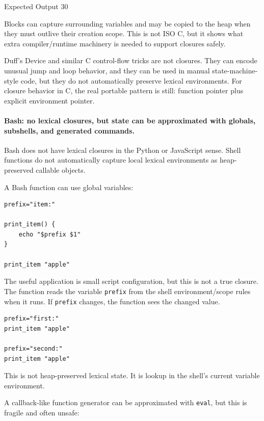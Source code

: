 \begin{iobox}{Expected Output}
30 \\
\end{iobox}



Blocks can capture surrounding variables and may be copied to the heap when they must outlive their creation scope. This is not ISO C, but it shows what extra compiler/runtime machinery is needed to support closures safely.

Duff's Device and similar C control-flow tricks are not closures. They can encode unusual jump and loop behavior, and they can be used in manual state-machine-style code, but they do not automatically preserve lexical environments. For closure behavior in C, the real portable pattern is still: function pointer plus explicit environment pointer.

\paragraph{Bash: no lexical closures, but state can be approximated with globals, subshells, and generated commands.}

Bash does not have lexical closures in the Python or JavaScript sense. Shell functions do not automatically capture local lexical environments as heap-preserved callable objects.

A Bash function can use global variables:

\begin{verbatim}
prefix="item:"

print_item() {
    echo "$prefix $1"
}

print_item "apple"
\end{verbatim}

The useful application is small script configuration, but this is not a true closure. The function reads the variable \texttt{prefix} from the shell environment/scope rules when it runs. If \texttt{prefix} changes, the function sees the changed value.

\begin{verbatim}
prefix="first:"
print_item "apple"

prefix="second:"
print_item "apple"
\end{verbatim}

This is not heap-preserved lexical state. It is lookup in the shell's current variable environment.

A callback-like function generator can be approximated with \texttt{eval}, but this is fragile and often unsafe:

